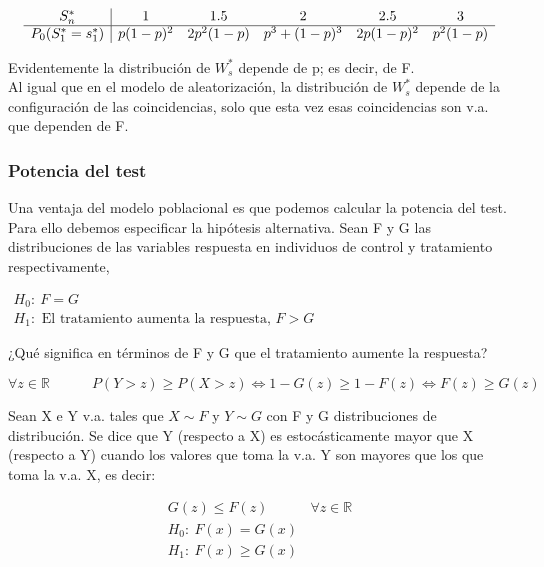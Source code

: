     $$
    \begin{array}{c|c c c c c}
        S^*_n & 1 & 1.5 & 2 & 2.5 & 3 \\ \hline 
        P_0(S^*_1=s^*_1) & p(1-p)^2 & 2p^2(1-p) & p^3+(1-p)^3 & 2p(1-p)^2 & p^2(1-p) \\
    \end{array}
    $$

Evidentemente la distribución de $W^*_s$ depende de p; es decir, de F.\\

Al igual que en el modelo de aleatorización, la distribución de $W^*_s$ depende de la configuración de las coincidencias, solo que esta vez esas coincidencias son v.a. que dependen de F.

\subsubsection{Potencia del test}
Una ventaja del modelo poblacional es que podemos calcular la potencia del test. Para ello debemos especificar la hipótesis alternativa. Sean F y G las distribuciones de las variables respuesta en individuos de control y tratamiento respectivamente,

$
\begin{array}{c}
    H_0:\ F=G \\
    H_1:\text{ El tratamiento aumenta la respuesta, }F>G
\end{array}
$

¿Qué significa en términos de F y G que el tratamiento aumente la respuesta?

$$
\forall z \in\mathbb{R}\quad\quad\quad P(Y>z)\geq P(X>z) \iff 1-G(z)\geq 1-F(z) \iff F(z)\geq G(z)
$$

\begin{theorem}
    Sean X e Y v.a. tales que $X\sim F$ y $Y\sim G$ con F y G distribuciones de distribución. Se dice que Y (respecto a X) es estocásticamente mayor que X (respecto a Y) cuando los valores que toma la v.a. Y son mayores que los que toma la v.a. X, es decir:
    
    $$
    \begin{array}{c}
        G(z)\leq F(z)\quad\quad\quad\forall z \in\mathbb{R}\\
        H_0:\ F(x)=G(x)\\
        H_1:\ F(x)\geq G(x)
    \end{array}
    $$

\end{theorem}

